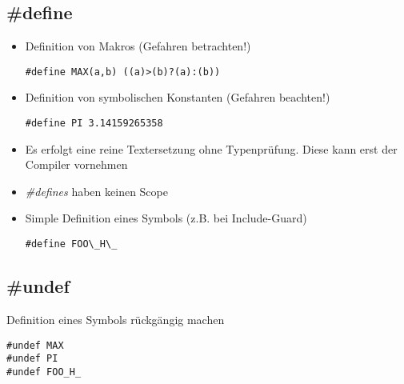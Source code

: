 \subsection{\#define}
\begin{itemize}
	\item Definition von Makros (Gefahren betrachten!)\hspace{0.05\linewidth}
	\begin{minipage}{0.5\linewidth}
	\vspace{-\baselineskip}
\begin{lstlisting}
#define MAX(a,b) ((a)>(b)?(a):(b))	
\end{lstlisting}
	\end{minipage}
	\item Definition von symbolischen Konstanten (Gefahren beachten!)\hspace{0.05\linewidth}
	\begin{minipage}{0.35\linewidth}
	\vspace{-\baselineskip}
\begin{lstlisting}
#define PI 3.14159265358
\end{lstlisting}
	\end{minipage}
	\item Es erfolgt eine reine Textersetzung ohne Typenprüfung. Diese kann erst der Compiler vornehmen
	\item \emph{\#defines} haben keinen Scope
	\item Simple Definition eines Symbols (z.B. bei Include-Guard)\hspace{0.05\linewidth}
	\begin{minipage}{0.25\linewidth}
	\vspace{-\baselineskip}
\begin{lstlisting}
#define FOO\_H\_
\end{lstlisting}
	\end{minipage}
\end{itemize}

\subsection{\#undef}
Definition eines Symbols rückgängig machen\\
\begin{minipage}{0.2\linewidth}
\vspace{-\baselineskip}
\begin{lstlisting}
#undef MAX
#undef PI
#undef FOO_H_
\end{lstlisting}
\end{minipage}

